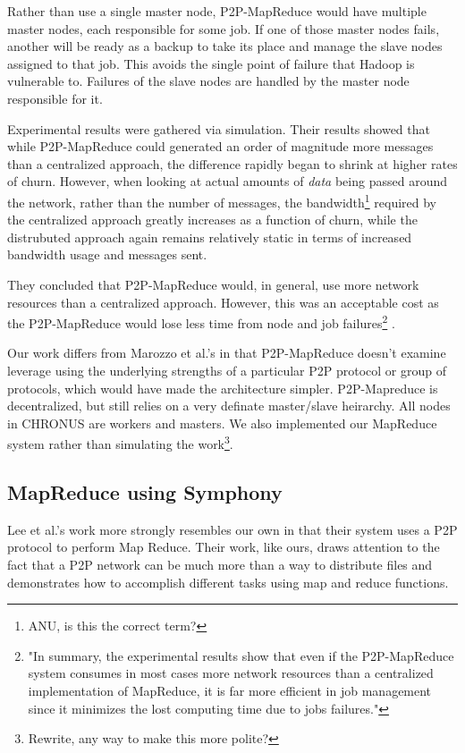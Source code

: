 \documentclass[conference, compsocconf, letterpaper]{IEEEtran}
\begin{document}
Rather than use a single master node, P2P-MapReduce would have multiple master nodes, each responsible for some job.  If one of those master nodes fails, another will be ready as a backup to take its place and manage the slave nodes assigned to that job.  This avoids the single point of failure that Hadoop is vulnerable to. Failures of the slave nodes are handled by the master node responsible for it.

Experimental results were gathered via simulation. Their results showed that while P2P-MapReduce could generated an order of magnitude more messages than a centralized approach, the difference rapidly began to shrink at higher rates of churn.  However, when looking at actual amounts of \emph{data} being passed around the network, rather than the number of messages, the bandwidth\footnote{ANU, is this the correct term?} required by the centralized approach greatly increases as a function of churn, while the distrubuted approach again remains relatively static in terms of increased bandwidth usage and messages sent.  

They concluded that P2P-MapReduce would, in general, use more network resources than a centralized approach. However, this was an acceptable cost as the P2P-MapReduce would lose less time from node and job failures\footnote{"In summary, the experimental results show that even if the P2P-MapReduce system consumes in most cases more network resources than a centralized implementation of MapReduce, it is far more efficient in job management since it minimizes the lost computing time due to jobs failures."\cite{marozzo2012p2p}} \cite{marozzo2012p2p}.

Our work differs from Marozzo et al.'s in that P2P-MapReduce doesn't examine leverage using the underlying strengths of a particular P2P protocol or group of protocols, which would have made the architecture simpler.  P2P-Mapreduce is decentralized, but still relies on a very definate master/slave heirarchy.  All nodes in CHRONUS are workers and masters.  We also implemented our MapReduce system rather than simulating the work\footnote{Rewrite, any way to make this more polite?}.

\subsection{MapReduce using Symphony}
Lee et al.'s work more strongly resembles our own in that their system uses a P2P protocol to perform Map Reduce\cite{leemap}.  Their work, like ours, draws attention to the fact that a P2P network can be much more than a way to distribute files and demonstrates how to accomplish different tasks using map and reduce functions.
\end{document}
